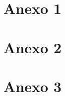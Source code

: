 \begin{anexosenv}
\partanexos
\chapter{Anexo 1}
    \lipsum[30]
\chapter{Anexo 2}
    \lipsum[31]
\chapter{Anexo 3}
    \lipsum[32]
\end{anexosenv}


\printindex

\printglossaries


